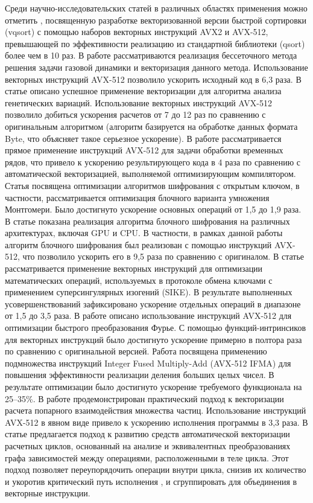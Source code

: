 Среди научно-исследовательских статей в различных областях применения можно отметить \cite{Blacher2022VecQuick}, посвященную разработке векторизованной версии быстрой сортировки (vqsort) с помощью наборов векторных инструкций AVX2 и AVX-512, превышающей по эффективности реализацию из стандартной библиотеки (qsort) более чем в 10 раз.
В работе \cite{Long2022VecSPD} рассматриваются реализация бессеточного метода решения задачи газовой динамики и векторизация данного метода. 
Использование векторных инструкций AVX-512 позволило ускорить исходный код в 6,3 раза.
В статье \cite{PonteFernandez2022VecInteractions} описано успешное применение векторизации для алгоритма анализа генетических вариаций.
Использование векторных инструкций AVX-512 позволило добиться ускорения расчетов от 7 до 12 раз по сравнению с оригинальным алгоритмом (алгоритм базируется на обработке данных формата Byte, что объясняет такое серьезное ускорение).
В работе \cite{Quisland2023VecSeries} рассматривается прямое применение инструкций AVX-512 для задачи обработки временных рядов, что привело к ускорению результирующего кода в 4 раза по сравнению с автоматической векторизацией, выполняемой оптимизирующим компилятором. 
Статья \cite{Buhrow2022VecMult} посвящена оптимизации алгоритмов шифрования с открытым ключом, в частности, рассматривается оптимизация блочного варианта умножения Монтгомери.
Было достигнуто ускорение основных операций от 1,5 до 1,9 раза.
В статье \cite{Choi2022VecPIPO} показана реализация алгоритма блочного шифрования на различных архитектурах, включая GPU и CPU.
В частности, в рамках данной работы алгоритм блочного шифрования был реализован с помощью инструкций AVX-512, что позволило ускорить его в 9,5 раза по сравнению с оригиналом.
В статье \cite{Cheng2022VecSIKE} рассматривается применение векторных инструкций для оптимизации математических операций, используемых в протоколе обмена ключами с применением суперсингулярных изогений (SIKE).
В результате выполненных усовершенствований зафиксировано ускорение отдельных операций в диапазоне от 1,5 до 3,5 раза.
В работе \cite{Sansone2023VecFourier} описано использование инструкций AVX-512 для оптимизации быстрого преобразования Фурье.
С помощью функций-интринсиков для векторных инструкций было достигнуто ускорение примерно в полтора раза по сравнению с оригинальной версией.
Работа \cite{Edamatsu2023VecDiv} посвящена применению подмножества инструкций Integer Fused Multiply-Add (AVX-512 IFMA) для повышения эффективности реализации деления больших целых чисел.
В результате оптимизации было достигнуто ускорение требуемого функционала на 25–35\%.
В работе \cite{Medakin2021VecPP} продемонстрирован практический подход к векторизации расчета попарного взаимодействия множества частиц.
Использование инструкций AVX-512 в явном виде привело к ускорению исполнения программы в 3,3 раза.
В статье \cite{Tayeb2023VecAuto} предлагается подход к развитию средств автоматической векторизации расчетных циклов, основанный на анализе и эквивалентных преобразованиях графа зависимостей между операциями, расположенными в теле цикла.
Этот подход позволяет переупорядочить операции внутри цикла, снизив их количество и укоротив критический путь исполнения \cite{Laukemann2019VecAuto}, и сгруппировать для объединения в векторные инструкции.

